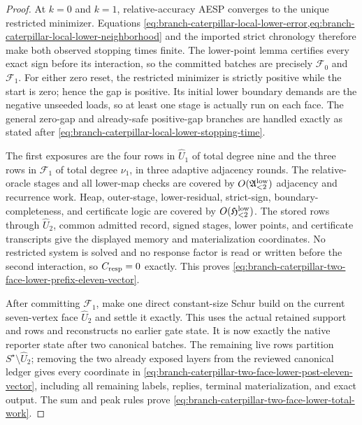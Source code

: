 \begin{proof}
At $k=0$ and $k=1$, relative-accuracy AESP converges to the unique restricted
minimizer.  Equations
\cref{eq:branch-caterpillar-local-lower-error,eq:branch-caterpillar-local-lower-neighborhood}
and the imported strict chronology therefore make both observed stopping
times finite.  The lower-point lemma certifies every exact sign before its
interaction, so the committed batches are precisely $\mathcal F_0$ and
$\mathcal F_1$.  For either zero reset, the restricted minimizer is strictly
positive while the start is zero; hence the gap is positive.  Its initial
lower boundary demands are the negative unseeded loads, so at least one stage
is actually run on each face.  The general zero-gap and already-safe
positive-gap branches are handled exactly as stated after
\cref{eq:branch-caterpillar-local-lower-stopping-time}.

The first exposures are the four rows in $\widehat U_1$ of total degree nine
and the three rows in $\mathcal F_1$ of total degree $\nu_1$, in three
adaptive adjacency rounds.  The relative-oracle stages and all lower-map
checks are covered by $O(\mathfrak A_{<2}^{\rm low})$ adjacency and recurrence
work.  Heap, outer-stage, lower-residual, strict-sign, boundary-completeness,
and certificate logic are covered by
$O(\mathfrak H_{<2}^{\rm low})$.  The stored rows through $\widehat U_2$,
common admitted record, signed stages, lower points, and certificate
transcripts give the displayed memory and materialization coordinates.  No
restricted system is solved and no response factor is read or written before
the second interaction, so $C_{\rm resp}=0$ exactly.  This proves
\cref{eq:branch-caterpillar-two-face-lower-prefix-eleven-vector}.

After committing $\mathcal F_1$, make one direct constant-size Schur build on
the current seven-vertex face $\widehat U_2$ and settle it exactly.  This uses
the actual retained support and rows and reconstructs no earlier gate state.
It is now exactly the native reporter state after two canonical batches.
The remaining live rows partition $S^\star\setminus\widehat U_2$; removing
the two already exposed layers from the reviewed canonical ledger gives
every coordinate in
\cref{eq:branch-caterpillar-two-face-lower-post-eleven-vector}, including all
remaining labels, replies, terminal materialization, and exact output.  The
sum and peak rules prove
\cref{eq:branch-caterpillar-two-face-lower-total-work}.
\end{proof}

